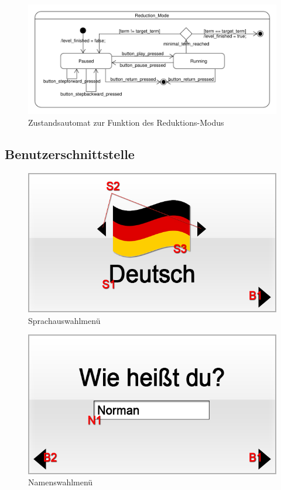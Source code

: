 \begin{figure}[H]
\centering
\includegraphics[scale=0.55]{../system_models/dynamic_models/reduction_mode_state_machine.pdf}
\caption{Zustandsautomat zur Funktion des Reduktions-Modus}
\end{figure}


\subsection{Benutzerschnittstelle}

\begin{figure}[H]
\centering
\includegraphics[scale=0.55]{../gui/_jpeg_numeration/registration1.jpg}
\caption{Sprachauswahlmenü}
\label{fig:Sprachauswahlmenu}
\end{figure}

\begin{figure}[H]
\centering
\includegraphics[scale=0.55]{../gui/_jpeg_numeration/registration2.jpg}
\caption{Namenswahlmenü}
\label{fig:Namenswahlmenu}
\end{figure}

